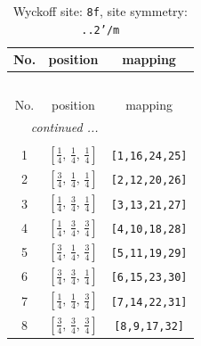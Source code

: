 \documentclass[fleqn,8pt]{jsarticle}
\begin{document}
\begin{longtable}{ccc}
\caption{Wyckoff site: {\tt 8f}, site symmetry: {\tt ..2'/m}}
 \\
 \hline \hline
No. & position & mapping \\ \hline \endfirsthead

\multicolumn{2}{l}{\tablename\ \thetable{}} \\
 \hline \hline
No. & position & mapping \\ \hline \endhead

 \hline \hline
\multicolumn{2}{r}{\footnotesize\it continued ...} \\ \endfoot

 \hline \hline
\multicolumn{2}{r}{} \\ \endlastfoot

1 & $\left[ \frac{1}{4},\, \frac{1}{4},\, \frac{1}{4} \right]$ & {\tt [1,16,24,25]} \\ \hline
2 & $\left[ \frac{3}{4},\, \frac{1}{4},\, \frac{1}{4} \right]$ & {\tt [2,12,20,26]} \\ \hline
3 & $\left[ \frac{1}{4},\, \frac{3}{4},\, \frac{1}{4} \right]$ & {\tt [3,13,21,27]} \\ \hline
4 & $\left[ \frac{1}{4},\, \frac{3}{4},\, \frac{3}{4} \right]$ & {\tt [4,10,18,28]} \\ \hline
5 & $\left[ \frac{3}{4},\, \frac{1}{4},\, \frac{3}{4} \right]$ & {\tt [5,11,19,29]} \\ \hline
6 & $\left[ \frac{3}{4},\, \frac{3}{4},\, \frac{1}{4} \right]$ & {\tt [6,15,23,30]} \\ \hline
7 & $\left[ \frac{1}{4},\, \frac{1}{4},\, \frac{3}{4} \right]$ & {\tt [7,14,22,31]} \\ \hline
8 & $\left[ \frac{3}{4},\, \frac{3}{4},\, \frac{3}{4} \right]$ & {\tt [8,9,17,32]} \\
\end{longtable}
\renewcommand{\arraystretch}{1.2}
\end{document}
